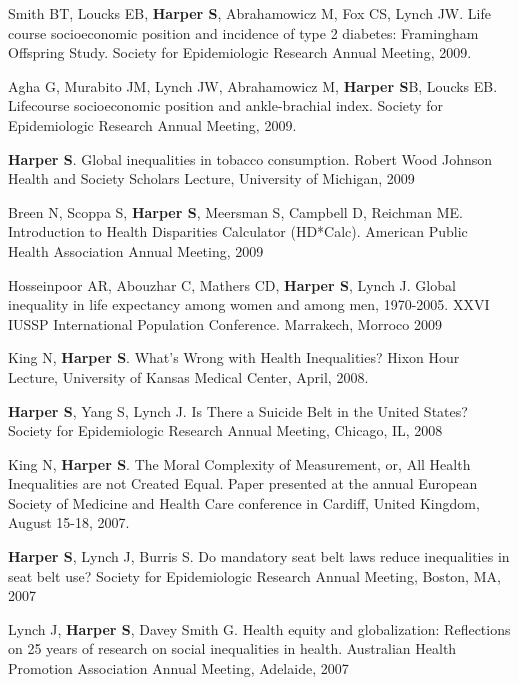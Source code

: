 \documentclass[
  letterpaper,
  DIV=11,
  numbers=noendperiod]{scrartcl}
\begin{document}
\begin{etaremune}
\item   Smith BT, Loucks EB, \textbf{Harper S}, Abrahamowicz M, Fox CS, Lynch JW. Life course socioeconomic position and incidence of type 2 diabetes: Framingham Offspring Study. Society for Epidemiologic Research Annual Meeting, 2009.

\item   Agha G, Murabito JM, Lynch JW, Abrahamowicz M, \textbf{Harper S}B, Loucks EB. Lifecourse socioeconomic position and ankle-brachial index. Society for Epidemiologic Research Annual Meeting, 2009.

\item   \textbf{Harper S}. Global inequalities in tobacco consumption.  Robert Wood Johnson Health and Society Scholars Lecture, University of Michigan, 2009

\item   Breen N, Scoppa S, \textbf{Harper S}, Meersman S, Campbell D, Reichman ME. Introduction to Health Disparities Calculator (HD*Calc).  American Public Health Association Annual Meeting, 2009

\item   Hosseinpoor AR, Abouzhar C, Mathers CD, \textbf{Harper S}, Lynch J.  Global inequality in life expectancy among women and among men, 1970-2005.   XXVI IUSSP International Population Conference.  Marrakech, Morroco 2009

\item King N, \textbf{Harper S}.  What's Wrong with Health Inequalities? Hixon Hour Lecture, University of Kansas Medical Center, April, 2008.

\item   \textbf{Harper S}, Yang S, Lynch J.  Is There a Suicide Belt in the United States?  Society for Epidemiologic Research Annual Meeting, Chicago, IL, 2008

\item   King N, \textbf{Harper S}.  The Moral Complexity of Measurement, or, All Health Inequalities are not Created Equal.  Paper presented at the annual European Society of Medicine and Health Care conference in Cardiff, United Kingdom, August 15-18, 2007.

\item   \textbf{Harper S}, Lynch J, Burris S.  Do mandatory seat belt laws reduce inequalities in seat belt use?  Society for Epidemiologic Research Annual Meeting, Boston, MA, 2007

\item Lynch J, \textbf{Harper S}, Davey Smith G.  Health equity and globalization: Reflections on 25 years of research on social inequalities in health. Australian Health Promotion Association Annual Meeting, Adelaide, 2007


\end{etaremune}
\end{document}
